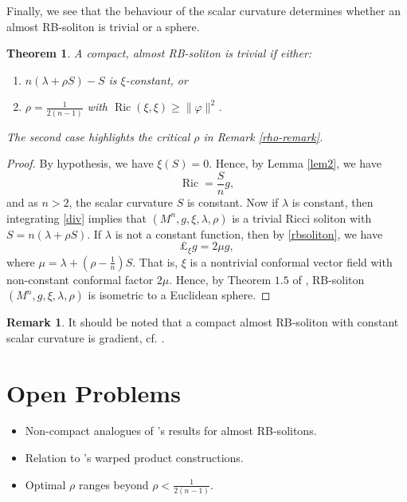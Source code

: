 \documentclass[a4paper, twoside, 10pt]{article}
\numberwithin{equation}{section}
\newtheorem{theorem}{Theorem}[section]
\theoremstyle{definition}
\newtheorem{remark}{Remark}[section]
\begin{document}
Finally, we see that the behaviour of the scalar curvature 
determines whether an almost RB-soliton is trivial or a
sphere.


\begin{theorem}\label{thm4.4}
A compact, almost RB-soliton is trivial if either:
\begin{enumerate}
    \item $n(\lambda+\rho S)-S$ is $\xi$-constant, or
    \item $\rho = \frac{1}{2(n-1)}$ with $\operatorname{Ric}(\xi,\xi) \geq \|\varphi\|^2$.
\end{enumerate}
The second case highlights the critical $\rho$ in Remark \ref{rho-remark}.
\end{theorem}
\begin{proof}
    By hypothesis, we have  $\xi(S)=0$.
    Hence, by  Lemma \ref{lem2}, we have 
    \[
    \operatorname{Ric}=\frac{S}{n}g,
    \]
 and as $n>2$, the scalar curvature $S$ is constant.
   Now  if $\lambda$ is constant, then 
integrating \eqref{div} implies that 
$(M^n,g,\xi,\lambda,\rho)$ is a trivial Ricci soliton with $S=n(\lambda+\rho S)$.
If $\lambda$ is not a constant function, then by \eqref{rbsoliton}, we have
\[\pounds_\xi g=2\mu g,
\]
where $\mu=\lambda+\left(\rho-\frac{1}{n}\right)S$. That is, $\xi$ is a nontrivial conformal vector field with 
non-constant conformal factor $2\mu$.  Hence, by Theorem $1.5$ of \cite{SDRBS}, RB-soliton $(M^n,g,\xi,\lambda,\rho)$ is isometric to a Euclidean sphere.
\end{proof}



 \begin{remark}
  It should be noted that a compact almost RB-soliton with constant scalar curvature is gradient, cf. \cite{BBR}.
\end{remark}


\section*{Open Problems}
\begin{itemize}
    \item Non-compact analogues of \cite{BBR}'s results for almost RB-solitons.
    \item Relation to \cite{feitosa2019gradient}'s warped product constructions.
    \item Optimal $\rho$ ranges beyond $\rho<\frac{1}{2(n-1)}$.
\end{itemize}
\end{document}
